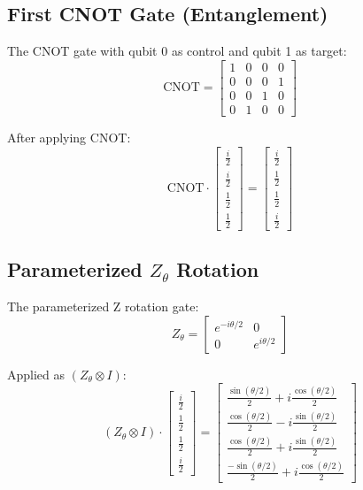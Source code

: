 \documentclass[
	a4paper,
	12pt,
	oneside,
]{article}
\begin{document}
\subsection{First CNOT Gate (Entanglement)}

The CNOT gate with qubit 0 as control and qubit 1 as target:
\[
\text{CNOT} = \begin{bmatrix}
	1 & 0 & 0 & 0 \\
	0 & 0 & 0 & 1 \\
	0 & 0 & 1 & 0 \\
	0 & 1 & 0 & 0
\end{bmatrix}
\]

After applying CNOT:
\[
\text{CNOT} \cdot \begin{bmatrix}
	\frac{i}{2} \\
	\frac{i}{2} \\
	\frac{1}{2} \\
	\frac{1}{2}
\end{bmatrix} = \begin{bmatrix}
	\frac{i}{2} \\
	\frac{1}{2} \\
	\frac{1}{2} \\
	\frac{i}{2}
\end{bmatrix}
\]

\subsection{Parameterized $Z_\theta$ Rotation}

The parameterized Z rotation gate:
\[
Z_\theta = \begin{bmatrix}
	e^{-i\theta/2} & 0 \\
	0 & e^{i\theta/2}
\end{bmatrix}
\]

Applied as $(Z_\theta \otimes I)$:
\[
(Z_\theta \otimes I) \cdot \begin{bmatrix}
	\frac{i}{2} \\
	\frac{1}{2} \\
	\frac{1}{2} \\
	\frac{i}{2}
\end{bmatrix} = \begin{bmatrix}
	\frac{\sin(\theta/2)}{2} + i\frac{\cos(\theta/2)}{2} \\
	\frac{\cos(\theta/2)}{2} - i\frac{\sin(\theta/2)}{2} \\
	\frac{\cos(\theta/2)}{2} + i\frac{\sin(\theta/2)}{2} \\
	\frac{-\sin(\theta/2)}{2} + i\frac{\cos(\theta/2)}{2}
\end{bmatrix}
\]
\end{document}
